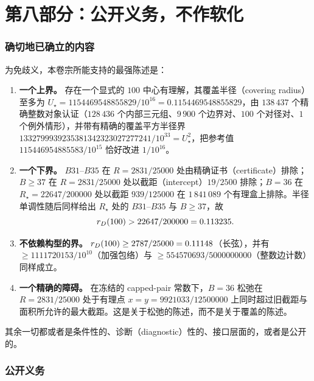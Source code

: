 \part*{第八部分：公开义务，不作软化}
\setcounter{section}{0}

\section{确切地已确立的内容}

为免歧义，本卷宗所能支持的最强陈述是：

\begin{enumerate}[leftmargin=1.6em,itemsep=3pt]
\item \textbf{一个上界。} 存在一个显式的 $100$ 中心有理解，其覆盖半径（covering radius）至多为 $U_\star=1154469548855829/10^{16}=0.1154469548855829$，由
$138\,437$ 个精确整数对象认证（$128\,436$ 个内部三元组、$9\,900$ 个边界对、$100$
个对径对、$1$ 个例外情形），并带有精确的覆盖平方半径界
$1332799939235381342323027277241/10^{33}=U_\star^2$，把参考值
$115446954885583/10^{15}$ 恰好改进 $1/10^{16}$。
\item \textbf{一个下界。} $B31$--$B35$ 在 $R=2831/25000$ 处由精确证书（certificate）排除；
$B\ge37$ 在 $R=2831/25000$ 处以截距（intercept）$19/2500$ 排除；$B=36$ 在
$R_\star=22647/200000$ 处以截距 $939/125000$ 在 $1\,841\,089$ 个有理盒上排除。半径
单调性随后同样给出 $R_\star$ 处的 $B31$--$B35$ 与 $B\ge37$，故
\[
r_{D}(100)>22647/200000=0.113235 .
\]
\item \textbf{不依赖构型的界。} $r_{D}(100)\ge2787/25000=0.11148$（长弦），并有
$\ge1111720153/10^{10}$（加强包络）与 $\ge554570693/5000000000$（整数边计数）
同样成立。
\item \textbf{一个精确的障碍。} 在冻结的 capped-pair 常数下，$B=36$ 松弛在
$R=2831/25000$ 处于有理点 $x=y=9921033/12500000$ 上同时超过旧截距与面积所允许的最大截距。这是关于松弛的陈述，而不是关于覆盖的陈述。
\end{enumerate}

其余一切都或者是条件性的、诊断（diagnostic）性的、接口层面的，或者是公开的。

\section{公开义务}


